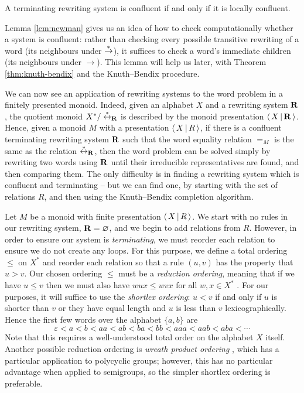 \begin{lemma}
  \label{lem:newman}
  A terminating rewriting system is confluent if and only if it is locally
  confluent.
\end{lemma}

Lemma \ref{lem:newman} gives us an idea of how to check computationally whether
a system is confluent: rather than checking every possible transitive rewriting
of a word (its neighbours under $\stackrel{*}{\to}$), it suffices to check a word's
immediate children (its neighbours under $\to$).  This lemma will help us later,
with Theorem \ref{thm:knuth-bendix} and the Knuth--Bendix procedure.

We can now see an application of rewriting systems to the word problem in a
finitely presented monoid.  Indeed, given an alphabet $X$ and a rewriting system
$\mathbf{R}$, the quotient monoid $X^* / \stackrel{*}{\leftrightarrow}_{\mathbf{R}}$ is described by the
monoid presentation $\left\langle \, X \, \middle| \, \mathbf{R} \, \right\rangle$.  Hence, given a monoid $M$ with a
presentation $\left\langle \, X \, \middle| \, R \, \right\rangle$, if there is a confluent terminating rewriting system
$\mathbf{R}$ such that the word equality relation $=_M$ is the same as the
relation $\stackrel{*}{\leftrightarrow}_{\mathbf{R}}$, then the word problem can be solved
simply by rewriting two words using $\mathbf{R}$ until their irreducible
representatives are found, and then comparing them.  The only difficulty is in
finding a rewriting system which is confluent and terminating -- but we can find
one, by starting with the set of relations $R$, and then using the Knuth--Bendix
completion algorithm.

Let $M$ be a monoid with finite presentation $\left\langle \, X \, \middle| \, R \, \right\rangle$.  We start with no
rules in our rewriting system, $\mathbf{R} = \varnothing$, and we begin to add
relations from $R$.  However, in order to ensure our system is
\textit{terminating}, we must reorder each relation to ensure we do not create
any loops.  For this purpose, we define a total ordering $\leq$ on $X^*$ and
reorder each relation so that a rule $(u, v)$ has the property that $u > v$.
Our chosen ordering $\leq$ must be a 
\textit{reduction ordering}, meaning that if we have $u \leq v$ then we must
also have $wux \leq wvx$ for all $w,x \in X^*$ \cite[\S12.2]{cgt}.  For our
purposes, it will suffice to use the  \textit{shortlex
  ordering}: $u < v$ if and only if $u$ is shorter than $v$ or they have equal
length and $u$ is less than $v$ lexicographically.  Hence the first few words
over the alphabet $\{a, b\}$ are
$$\varepsilon < a < b < aa < ab < ba < bb < aaa < aab < aba < \cdots$$
Note that this requires a well-understood total order on the alphabet $X$
itself.  Another possible reduction ordering is \textit{wreath product ordering}
\cite[\S2.1]{sims}, which has a particular application to polycyclic groups;
however, this has no particular advantage when applied to semigroups, so the
simpler shortlex ordering is preferable.


